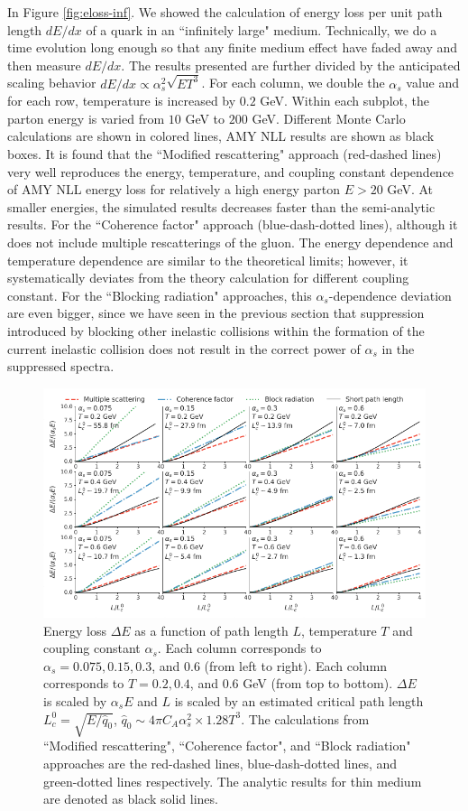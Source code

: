 \documentclass[aps, prc, reprint, amsmath, groupedaddress, nofootinbib]{revtex4-1}
\begin{document}
In Figure \ref{fig:eloss-inf}. We showed the calculation of energy loss per unit path length $dE/dx$ of a quark in an ``infinitely large" medium. 
Technically, we do a time evolution long enough so that any finite medium effect have faded away and then measure $dE/dx$.
The results presented are further divided by the anticipated scaling behavior $dE/dx \propto \alpha_s^2 \sqrt{ET^3}$.
For each column, we double the $\alpha_s$ value and for each row, temperature is increased by $0.2$ GeV. 
Within each subplot, the parton energy is varied from $10$ GeV to $200$ GeV.
Different Monte Carlo calculations are shown in colored lines, AMY NLL results are shown as black boxes. 
It is found that the ``Modified rescattering" approach (red-dashed lines) very well reproduces the energy, temperature, and coupling constant dependence of AMY NLL energy loss for relatively a high energy parton $E>20$ GeV.
At smaller energies, the simulated results decreases faster than the semi-analytic results.
For the ``Coherence factor" approach (blue-dash-dotted lines), although it does not include multiple rescatterings of the gluon. The energy dependence and temperature dependence are similar to the theoretical limits; however, it systematically deviates from the theory calculation for different coupling constant.
For the ``Blocking radiation" approaches, this $\alpha_s$-dependence deviation are even bigger, since we have seen in the previous section that suppression introduced by blocking other inelastic collisions within the formation of the current inelastic collision does not result in the correct power of $\alpha_s$ in the suppressed spectra.

\begin{figure}
\includegraphics[width=\textwidth]{Eloss_Ldep.pdf}
\caption{Energy loss $\Delta E$ as a function of path length $L$, temperature $T$ and coupling constant $\alpha_s$. Each column corresponds to $\alpha_s = 0.075, 0.15, 0.3$, and $0.6$ (from left to right). Each column corresponds to $T = 0.2, 0.4$, and $0.6$ GeV (from top to bottom). $\Delta E$ is scaled by $\alpha_s E$ and $L$ is scaled by an estimated critical path length $L_c^0 = \sqrt{E/\hat{q}_0}$, $\hat{q}_0\sim 4\pi C_A\alpha_s^2 \times 1.28 T^3$. The calculations from ``Modified rescattering", ``Coherence factor", and ``Block radiation" approaches are the red-dashed lines, blue-dash-dotted lines, and green-dotted lines respectively. The analytic results for thin medium are denoted as black solid lines.}
\label{fig:eloss-ldep}
\end{figure}
\end{document}
